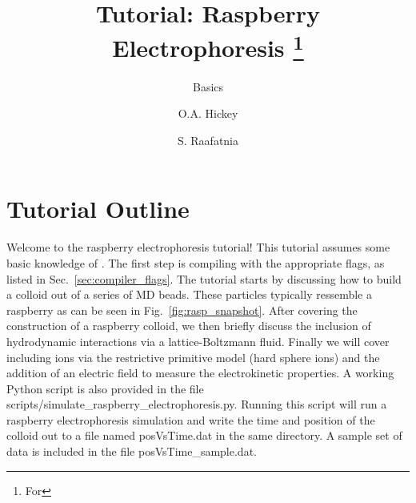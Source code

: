 \documentclass[
paper=a4,                       %
fontsize=11pt,                  %
twoside,                        %
footsepline,                    %
headsepline,                    %
headinclude=false,              %
footinclude=false,              %
pagesize,                       %
]{scrartcl}
\begin{document}
\title{Tutorial: Raspberry Electrophoresis%
\ifdefined\esversion%
\thanks{For \es \esversion}%
\fi%
}
\subtitle{\es Basics}
\author{O.A. Hickey \and S. Raafatnia}
\maketitle


\section{Tutorial Outline}

Welcome to the raspberry electrophoresis \es{} tutorial! This tutorial assumes some basic knowledge of \es{}.
The first step is compiling \es{} with the appropriate flags, as listed in Sec.~\ref{sec:compiler_flags}.
The tutorial starts by discussing how to build a colloid out of a series of MD beads. These particles typically
ressemble a raspberry as can be seen in Fig.~\ref{fig:rasp_snapshot}. After covering the construction of a raspberry colloid, we then
briefly discuss the inclusion of hydrodynamic interactions via a lattice-Boltzmann fluid. Finally we will cover
including ions via the restrictive primitive model (hard sphere ions) and the addition of an electric field
to measure the electrokinetic properties. A working Python script is also provided in the file scripts/simulate\_raspberry\_electrophoresis.py. Running
this script will run a raspberry electrophoresis simulation and write the time and position of the colloid out to a file named posVsTime.dat in the same directory.
A sample set of data is included in the file posVsTime\_sample.dat.
\end{document}
